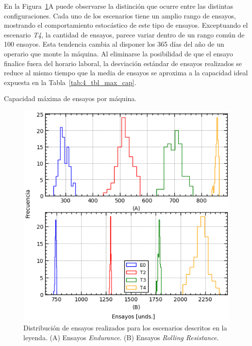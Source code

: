 En la Figura~\ref{fig:4_hist_tests_done}A puede observarse la distinción
que ocurre entre las distintas configuraciones.
Cada uno de los escenarios tiene un amplio rango de ensayos,
mostrando el comportamiento estocástico de este tipo de ensayos.
Exceptuando el escenario \textit{T4},
la cantidad de ensayos, parece variar dentro de un rango común de 100 ensayos.
Esta tendencia cambia al disponer los 365 días del año 
de un operario que monte la máquina.
Al eliminarse la posibilidad
de que el ensayo finalice fuera del horario laboral,
la desviación estándar de ensayos realizados se reduce al mismo tiempo
que la media de ensayos se aproxima a la capacidad ideal
expuesta en la Tabla~\ref{tab:4_tbl_max_cap}.

\begin{table}[H]
	\centering
	\caption{Capacidad máxima de ensayos por máquina.}
	
	\label{tab:4_tbl_max_cap}
\end{table}

\begin{figure}
	\begin{center}
		\includegraphics{fig/4_hist_tests_done}
	\end{center}
	\caption{Distribución de ensayos realizados para los escenarios descritos en la leyenda.
	(A) Ensayos \textit{Endurance}. (B) Ensayos \textit{Rolling Resistance}.}
	\label{fig:4_hist_tests_done}
\end{figure}


